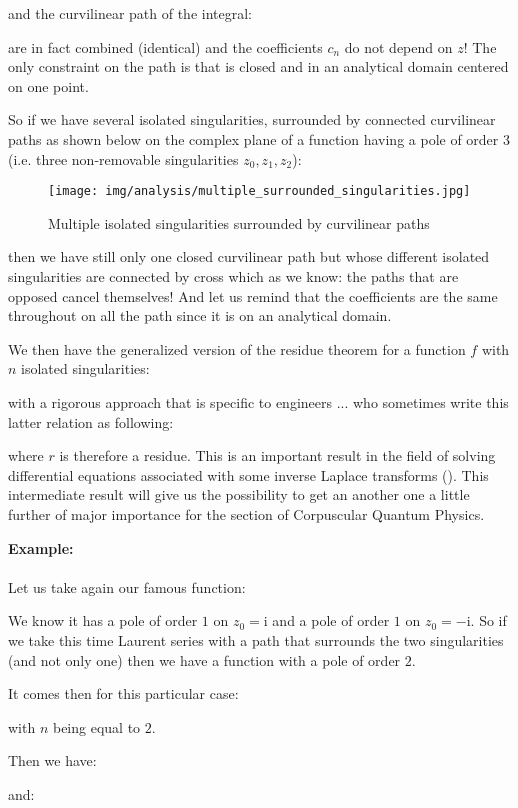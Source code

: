 	and the curvilinear path of the integral:
	
	are in fact combined (identical) and the coefficients $c_n$ do not depend on $z$! The only constraint on the path is that is closed and in an analytical domain centered on one point.
	
	So if we have several isolated singularities, surrounded by connected curvilinear paths as shown below on the complex plane of a function having a pole of order 3 (i.e. three non-removable singularities $z_0,z_1,z_2$):
	\begin{figure}[H]
		\centering
		\texttt{[image: img/analysis/multiple\_surrounded\_singularities.jpg]}
		\caption{Multiple isolated singularities surrounded by curvilinear paths}
	\end{figure}
	then we have still only one closed curvilinear path but whose different isolated singularities are connected by cross which as we know: the paths that are opposed  cancel themselves! And let us remind that the coefficients are the same throughout on all the path since it is on an analytical domain.
	
	We then have the generalized version of the residue theorem for a function $f$ with $n$ isolated singularities:
	
	with a rigorous approach that is specific to engineers ... who sometimes write this latter relation as following:
	
	where $r$ is therefore a residue. This is an important result in the field of solving differential equations associated with some inverse Laplace transforms (). This intermediate result will give us the possibility to get an another one a little further of major importance for the section of Corpuscular Quantum Physics.
	\begin{tcolorbox}[colframe=black,colback=white,sharp corners]
	\textbf{{\Large {}}Example:}\\\\
	Let us take again our famous function:
	
	We know it has a pole of order $1$ on $z_0=\mathrm{i}$ and a pole of order $1$ on $z_0=-\mathrm{i}$. So if we take this time Laurent series with a path that surrounds the two singularities (and not only one) then we have a function with a pole of order $2$.
	
	It comes then for this particular case:
	
	with $n$ being equal to $2$.
	
	Then we have:
	
	and:
	
	\end{tcolorbox}
	
